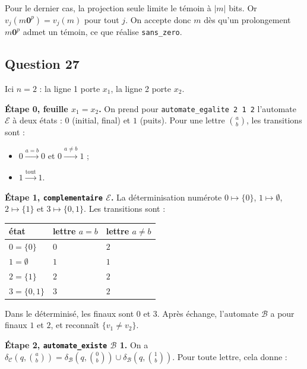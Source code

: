 \documentclass[11pt,a4paper]{article}
\providecommand{\tightlist}{\setlength{\itemsep}{0pt}\setlength{\parskip}{0pt}}
\begin{document}
Pour le dernier cas, la projection seule limite le témoin à \(\lvert m\rvert\) bits. Or \(v_j(m{\mathbf{0}}^p)=v_j(m)\) pour tout \(j\). On accepte donc \(m\) dès qu'un prolongement \(m{\mathbf{0}}^p\) admet un témoin, ce que réalise \texttt{sans\_zero}.

\hypertarget{question-27}{%
\subsection{Question 27}\label{question-27}}

Ici \(n=2\) : la ligne 1 porte \(x_1\), la ligne 2 porte \(x_2\).

\textbf{Étape 0, feuille \(x_1=x_2\).} On prend pour \texttt{automate\_egalite\ 2\ 1\ 2} l'automate \(\mathcal{E}\) à deux états : \(0\) (initial, final) et \(1\) (puits). Pour une lettre \(\binom ab\), les transitions sont :

\begin{itemize}
\tightlist
\item
  \(0\xrightarrow{a=b}0\) et \(0\xrightarrow{a\ne b}1\) ;
\item
  \(1\xrightarrow{\text{tout}}1\).
\end{itemize}

\textbf{Étape 1, \texttt{complementaire} \(\mathcal{E}\).} La déterminisation numérote \(0\mapsto\{0\}\), \(1\mapsto\emptyset\), \(2\mapsto\{1\}\) et \(3\mapsto\{0,1\}\). Les transitions sont :

\begin{longtable}[]{@{}lll@{}}
\toprule\noalign{}
état & lettre \(a=b\) & lettre \(a\ne b\) \\
\midrule\noalign{}
\endhead
\bottomrule\noalign{}
\endlastfoot
\(0=\{0\}\) & \(0\) & \(2\) \\
\(1=\emptyset\) & \(1\) & \(1\) \\
\(2=\{1\}\) & \(2\) & \(2\) \\
\(3=\{0,1\}\) & \(3\) & \(2\) \\
\end{longtable}

Dans le déterminisé, les finaux sont \(0\) et \(3\). Après échange, l'automate \(\mathcal{B}\) a pour finaux \(1\) et \(2\), et reconnaît \(\{v_1\ne v_2\}\).

\textbf{Étape 2, \texttt{automate\_existe} \(\mathcal{B}\) 1.} On a \(\delta_{\mathcal{C}}(q,\allowbreak \binom ab)=\delta_{\mathcal{B}}(q,\allowbreak \binom0b)\cup\delta_{\mathcal{B}}(q,\allowbreak \binom1b)\). Pour toute lettre, cela donne :
\end{document}
